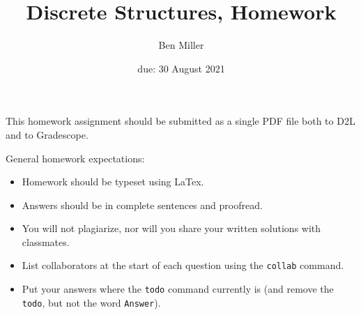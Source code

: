 \documentclass{article}
\title{Discrete Structures, Homework \hwnum}
\author{Ben Miller}
\date{due: 30 August 2021}
\begin{document}
\maketitle

This homework assignment should be
submitted as a single PDF file both to D2L and to Gradescope.

General homework expectations:
\begin{itemize}
      \item Homework should be typeset using LaTex.
      \item Answers should be in complete sentences and proofread.
      \item You will not plagiarize, nor will you share your written solutions
            with classmates.
      \item List collaborators at the start of each question using the
            \texttt{collab} command.
      \item Put your answers where the \texttt{todo} command currently is (and
            remove the \texttt{todo}, but not the word \texttt{Answer}).
\end{itemize}

\end{document}
